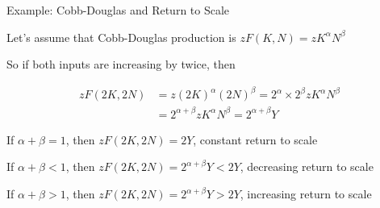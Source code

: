 \documentclass[11pt,aspectratio=169,usenames,dvipsnames]{beamer}
\let\tempa\enumerate
\let\tempb\endenumerate
\renewenvironment{enumerate}{\tempa\addtolength{\itemsep}{\fill}}{\tempb}
\begin{document}
\begin{frame}{Example: Cobb-Douglas and Return to Scale}
\label{slide:Example__Cobb_Douglas_and_Return_to_Scale}

Let's assume that Cobb-Douglas production is $ z F( K, N ) = z K^{\alpha} N^{\beta} $

So if both inputs are increasing by twice, then

%
\begin{align*}
    zF( 2K, 2N )
        & = z ( 2K )^{\alpha} ( 2N )^{\beta} = 2^{\alpha} \times 2^{\beta} z K^{\alpha} N^{\beta}
    \\
        & = 2^{\alpha+\beta} z K^{\alpha} N^{\beta} = 2^{\alpha+\beta} Y
\end{align*}
%
\begin{enumerate}
    \item If $ \alpha+\beta = 1 $, then $ zF( 2K, 2N ) = 2Y $, constant return to scale
    \item If $ \alpha+\beta < 1 $, then $ zF( 2K, 2N ) = 2^{\alpha+\beta}Y < 2Y $, decreasing return to scale
    \item If $ \alpha+\beta > 1 $, then $ zF( 2K, 2N ) = 2^{\alpha+\beta}Y > 2Y $, increasing return to scale
\end{enumerate}

\end{frame}
\end{document}
